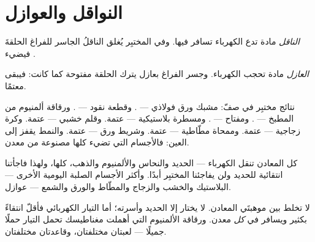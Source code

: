 \section{النواقل والعوازل}

\begin{definition}[الناقل]\label{def:g4:conductors-insulators:conductor}
\emph{الناقل} مادة تدع الكهرباء تسافر فيها. وفي
المختبِر يُغلق الناقلُ الجاسر للفراغ الحلقةَ فيضيء .
\end{definition}

\begin{definition}[العازل]\label{def:g4:conductors-insulators:insulator}
\emph{العازل} مادة تحجب الكهرباء. وجسر الفراغ بعازل
يترك الحلقة مفتوحة كما كانت: فيبقى  معتمًا.
\end{definition}

\begin{example}\label{ex:g4:conductors-insulators:trials}
نتائج مختبِر في صفّ: مشبك ورق فولاذي --- . وقطعة نقود ---
. ورقاقة ألمنيوم من المطبخ --- . ومفتاح --- .
ومسطرة بلاستيكية --- عتمة. وقلم خشبي --- عتمة. وكرة زجاجية
--- عتمة. وممحاة مطّاطية --- عتمة. وشريط ورق --- عتمة. والنمط
يقفز إلى العين: فالأجسام التي تضيء  كلها مصنوعة من
معدن.
\end{example}

\begin{proposition}\label{prop:g4:conductors-insulators:metals}
كل المعادن تنقل الكهرباء --- الحديد والنحاس والألمنيوم والذهب،
كلها، ولهذا فاجأتنا انتقائية  للحديد ولن يفاجئنا
المختبِر أبدًا. وأكثر الأجسام الصلبة اليومية الأخرى ---
البلاستيك والخشب والزجاج والمطّاط والورق والشمع --- عوازل.
\end{proposition}

\begin{remark}\label{rem:g4:conductors-insulators:notmagnet}
لا تخلط بين موهبتَي المعادن.  لا يختار إلا الحديد
وأسرته؛ أما التيار الكهربائي فأقلّ انتقاءً بكثير ويسافر في
\emph{كل} معدن. ورقاقة الألمنيوم التي أهملت مغناطيسك تحمل
التيار حملًا جميلًا --- لعبتان مختلفتان، وقاعدتان مختلفتان.
\end{remark}

